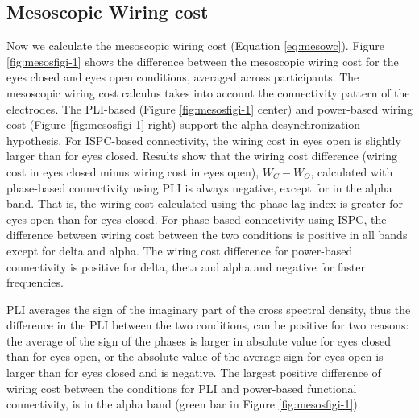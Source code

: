 \documentclass[11pt, onecolumn]{article}
\begin{document}

\subsection{Mesoscopic Wiring cost} %
Now we calculate the mesoscopic wiring cost (Equation \ref{eq:mesowc}). Figure \ref{fig:mesosfigi-1} shows the difference between the mesoscopic wiring cost for the eyes closed and eyes open conditions, averaged across  participants.
The mesoscopic wiring cost calculus takes into account the connectivity pattern of the electrodes. The PLI-based (Figure \ref{fig:mesosfigi-1} center) and power-based wiring cost (Figure \ref{fig:mesosfigi-1} right) support the alpha desynchronization hypothesis. For ISPC-based connectivity, the wiring cost in eyes open is slightly larger than for eyes closed.
Results show that the wiring cost difference (wiring cost in eyes closed  minus wiring cost in eyes open), $W_C - W_O$, calculated with phase-based connectivity using PLI is always negative, except for in the alpha band. That is, the wiring cost calculated using the phase-lag index is greater  for eyes open than for eyes closed. 
For phase-based connectivity using ISPC, the difference between wiring cost between the two conditions is positive in all bands except for delta and alpha. The wiring cost difference for power-based connectivity is positive for delta, theta and alpha and negative for faster frequencies. 

PLI averages the sign of the imaginary part of the cross spectral density, thus the difference in the PLI between the two conditions, can be positive for two reasons: the average of the sign of the phases is larger in absolute value for eyes closed than for eyes open, or the absolute value of the average sign for eyes open is larger than for eyes closed and is negative.
The largest positive difference of wiring cost between the conditions for PLI and power-based functional connectivity, is in the alpha band (green bar in Figure \ref{fig:mesosfigi-1}).
\end{document}
